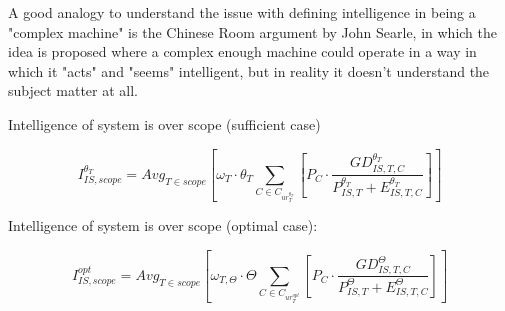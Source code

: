 \par
A good analogy to understand the issue with defining intelligence in being a
"complex machine" is the Chinese Room argument by John Searle, in which the idea
is proposed where a complex enough machine could operate in a way in which it
"acts" and "seems" intelligent, but in reality it doesn't understand the subject
matter at all.

\begin{quote}
	\par

\end{quote}

\par

Intelligence of system is over scope (sufficient case)

$$
	I^{{\theta}_T}_{IS,scope} = {Avg}_{T\in scope} \left[
	\omega_T\cdot\theta_T \sum_{C\in C_{{ur}_T^{\theta_T}}} \left[
	P_C \cdot \frac{GD_{IS,T,C}^{\theta_T}}{
	P_{IS,T}^{\theta_T}+E^{\theta_T}_{IS,T,C}}
	\right] \right]
$$

Intelligence of system is over scope (optimal case):

$$
	I^{opt}_{IS,scope} = {Avg}_{T\in scope} \left[
	\omega_{T,\Theta}\cdot\Theta \sum_{C\in C_{{ur}_T^{opt}}} \left[
	P_C \cdot \frac{GD_{IS,T,C}^{\Theta}}{
	P_{IS,T}^{\Theta}+E^{\Theta}_{IS,T,C}}
	\right] \right]
$$
